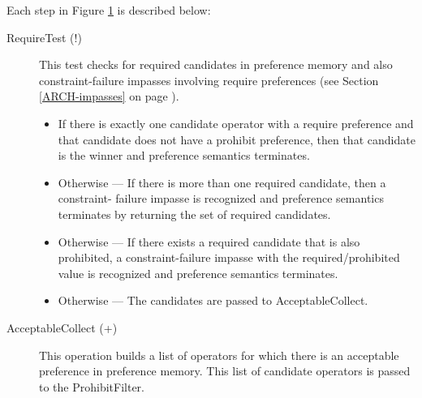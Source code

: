 
\begin{figure}
	\label{fig:prefsem}
\end{figure}

Each step in Figure \ref{fig:prefsem} is described below:

\begin{description}
	\item[RequireTest (!)]
	This test checks for required candidates in preference memory and
	also constraint-failure impasses involving require preferences (see
	Section \ref{ARCH-impasses} on page \pageref{ARCH-impasses}).
	
	\begin{itemize}
		\item If there is exactly one candidate operator with a require preference and
		that candidate does not have a prohibit preference, then that candidate
		is the winner and preference semantics terminates.
		\item Otherwise ---
		If there is more than one required candidate, then a constraint-
		failure impasse is recognized and preference semantics terminates 
		by returning the set of required candidates.
		\item Otherwise ---
		If there exists a required candidate that is also prohibited, a
		constraint-failure impasse with the required/prohibited value is
		recognized and preference semantics terminates.
		\item Otherwise ---
		The candidates are passed to AcceptableCollect.
	\end{itemize}
	
	\item[AcceptableCollect (+) ] This operation builds a list of operators
	for which there is an acceptable preference in preference memory.
	This list of candidate operators is passed to the ProhibitFilter.\index{+}
	

\end{description}
